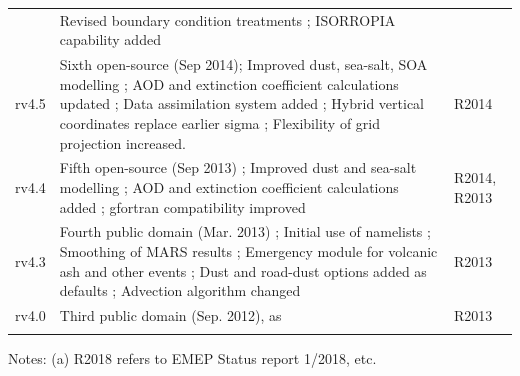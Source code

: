 \begin{table}
\begin{footnotesize}
\begin{tabular}{lp{11cm}l}
       & Revised boundary condition treatments %
       ; ISORROPIA capability added & \\
rv4.5  & Sixth open-source (Sep 2014);                    
        Improved dust, sea-salt, SOA modelling          %
       ; AOD and extinction coefficient calculations  updated %
       ; Data assimilation system added %
       ; Hybrid vertical coordinates replace earlier sigma %
       ; Flexibility of grid projection increased. & R2014\\
rv4.4   & Fifth open-source (Sep 2013) %
       ; Improved dust and sea-salt modelling   %
       ; AOD and extinction coefficient calculations added %
       ; gfortran compatibility improved            %
                  & R2014, R2013\\
rv4.3   & Fourth public domain (Mar. 2013)  %
       ; Initial use of namelists           %
       ; Smoothing of MARS results         %
       ; Emergency module for volcanic ash and other events%
       ; Dust and road-dust options added as defaults %
       ; Advection algorithm changed  %
             & R2013\\ 
rv4.0   & Third public domain (Sep. 2012), as \citet{Simpson:EMEP2012}            & R2013\\ 
        &                                                &\\
\hline
\end{tabular}
Notes: (a) R2018 refers to EMEP Status report 1/2018, etc.
\end{footnotesize}
\end{table}
